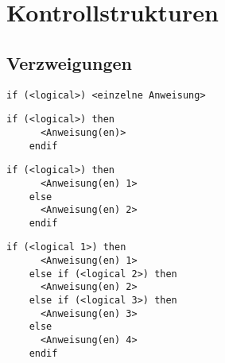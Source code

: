 \documentclass[a4paper, twocolumn]{scrarticle}
\begin{document}
  \section{Kontrollstrukturen}
  \subsection{Verzweigungen}
  \begin{lstlisting}[caption={\bfseries Einzeilige if-Anweisung}]
    if (<logical>) <einzelne Anweisung>
  \end{lstlisting}
  \begin{lstlisting}[caption={if-then}]
    if (<logical>) then
      <Anweisung(en)>
    endif
  \end{lstlisting}
  \begin{lstlisting}[caption={\bfseries if-then-else}]
    if (<logical>) then
      <Anweisung(en) 1>
    else
      <Anweisung(en) 2>
    endif
  \end{lstlisting}
  \begin{lstlisting}[caption={\bfseries if-then-else-if-...-else}]
    if (<logical 1>) then
      <Anweisung(en) 1>
    else if (<logical 2>) then
      <Anweisung(en) 2>
    else if (<logical 3>) then
      <Anweisung(en) 3>
    else
      <Anweisung(en) 4>
    endif
  \end{lstlisting}
\end{document}
